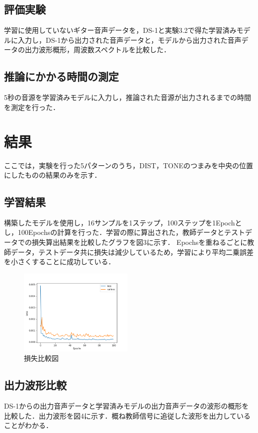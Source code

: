 \documentclass{jarticle}
\begin{document}
\subsection{評価実験}
学習に使用していないギター音声データを，DS-1と実験3.2で得た学習済みモデルに入力し，DS-1から出力された音声データと，モデルから出力された音声データの出力波形概形，周波数スペクトルを比較した．

\subsection{推論にかかる時間の測定}
5秒の音源を学習済みモデルに入力し，推論された音源が出力されるまでの時間を測定を行った．

\section{結果}
ここでは，実験を行った5パターンのうち，DIST，TONEのつまみを中央の位置にしたものの結果のみを示す．

\subsection{学習結果}
構築したモデルを使用し，16サンプルを1ステップ，100ステップを1Epochとし，100Epochsの計算を行った．学習の際に算出された，教師データとテストデータでの損失算出結果を比較したグラフを図3に示す．
Epochsを重ねるごとに教師データ，テストデータ共に損失は減少しているため，学習により平均二乗誤差を小さくすることに成功している．

\begin{figure}[htbp]
 \begin{center}
  \includegraphics[width=55mm]{gain5_loss_hikaku.png}
 \end{center}
 \caption{損失比較図}
 \label{fig:one}
\end{figure}

\subsection{出力波形比較}
DS-1からの出力音声データと学習済みモデルの出力音声データの波形の概形を比較した．出力波形を図4に示す．概ね教師信号に追従した波形を出力していることがわかる．
\end{document}
